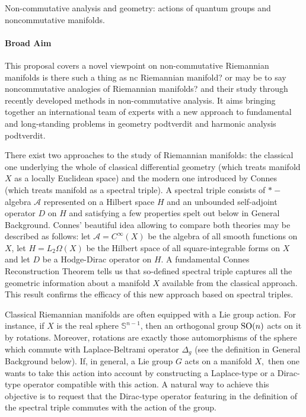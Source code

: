 \documentclass{article}
\newcommand{\archeading}[1]{\vspace{.3cm} \noindent{\bfseries #1} \vspace{.1cm}   }
\begin{document}
\parindent=20pt
\pagestyle{empty}
\newpage


\archeading{Project Title} Non-commutative analysis and geometry: actions of quantum groups and noncommutative manifolds.

\bigskip\archeading{Aims and Background}

\paragraph*{Broad Aim} This proposal covers a novel viewpoint on non-commutative Riemannian manifolds{\color{blue} is there such a thing as nc Riemannian manifold? or may be to say noncommutative analogies of Riemannian manifolds?}  and their study through recently developed methods in non-commutative analysis. It aims bringing together an international team of experts with a new approach to fundamental and long-standing problems in geometry {\color{red} podtverdit} and harmonic analysis {\color{red} podtverdit}.

There exist two approaches to the study of Riemannian manifolds: the classical one underlying the whole of classical differential geometry (which treats manifold $X$ as a locally Euclidean space) and the modern one introduced by Connes (which treats manifold as a spectral triple).  A spectral triple consists of $\ast-$algebra $\mathcal{A}$ represented on a Hilbert space $H$ and an unbounded self-adjoint operator $D$ on $H$ and satisfying a few properties spelt out below in General Background. Connes' beautiful idea \cite{Connes-book} allowing to compare both theories may be described as follows: let  $\mathcal{A}=C^{\infty}(X)$ be the algebra of all smooth functions on $X$, let $H=L_2\Omega(X)$ be the Hilbert space of all square-integrable forms on $X$ and let $D$ be a Hodge-Dirac operator \cite{BGV} on $H$. A fundamental Connes Reconstruction Theorem \cite{Connes-reconstruction} tells us that so-defined spectral triple captures all the geometric information about a manifold $X$ available from the classical approach. This result confirms the efficacy of this new approach based on spectral triples.

Classical {\color{blue} Riemannian}  manifolds are often equipped with a Lie group action. For instance, if $X$ is the real sphere $\mathbb{S}^{n-1}$, then an orthogonal group ${\rm SO}(n)$ acts on it by rotations. Moreover, rotations are exactly those automorphisms of the sphere which commute with Laplace-Beltrami operator $\Delta_g$ (see the definition in General Background below). If, in general, a Lie group $G$ acts on a manifold $X,$ then one wants to take this action into account by constructing a Laplace-type or a Dirac-type operator compatible with this action. A natural way to achieve this objective is to request that the Dirac-type operator featuring in the definition of the spectral triple commutes with the action of the group.
\end{document}
